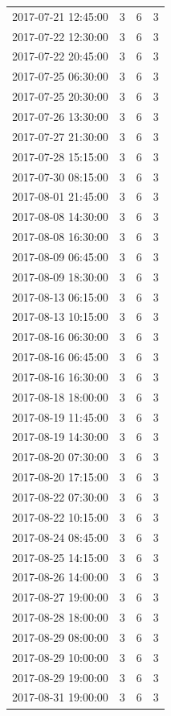 \begin{tabular}{lrrr}
2017-07-21 12:45:00 & 3 & 6 & 3 \\
2017-07-22 12:30:00 & 3 & 6 & 3 \\
2017-07-22 20:45:00 & 3 & 6 & 3 \\
2017-07-25 06:30:00 & 3 & 6 & 3 \\
2017-07-25 20:30:00 & 3 & 6 & 3 \\
2017-07-26 13:30:00 & 3 & 6 & 3 \\
2017-07-27 21:30:00 & 3 & 6 & 3 \\
2017-07-28 15:15:00 & 3 & 6 & 3 \\
2017-07-30 08:15:00 & 3 & 6 & 3 \\
2017-08-01 21:45:00 & 3 & 6 & 3 \\
2017-08-08 14:30:00 & 3 & 6 & 3 \\
2017-08-08 16:30:00 & 3 & 6 & 3 \\
2017-08-09 06:45:00 & 3 & 6 & 3 \\
2017-08-09 18:30:00 & 3 & 6 & 3 \\
2017-08-13 06:15:00 & 3 & 6 & 3 \\
2017-08-13 10:15:00 & 3 & 6 & 3 \\
2017-08-16 06:30:00 & 3 & 6 & 3 \\
2017-08-16 06:45:00 & 3 & 6 & 3 \\
2017-08-16 16:30:00 & 3 & 6 & 3 \\
2017-08-18 18:00:00 & 3 & 6 & 3 \\
2017-08-19 11:45:00 & 3 & 6 & 3 \\
2017-08-19 14:30:00 & 3 & 6 & 3 \\
2017-08-20 07:30:00 & 3 & 6 & 3 \\
2017-08-20 17:15:00 & 3 & 6 & 3 \\
2017-08-22 07:30:00 & 3 & 6 & 3 \\
2017-08-22 10:15:00 & 3 & 6 & 3 \\
2017-08-24 08:45:00 & 3 & 6 & 3 \\
2017-08-25 14:15:00 & 3 & 6 & 3 \\
2017-08-26 14:00:00 & 3 & 6 & 3 \\
2017-08-27 19:00:00 & 3 & 6 & 3 \\
2017-08-28 18:00:00 & 3 & 6 & 3 \\
2017-08-29 08:00:00 & 3 & 6 & 3 \\
2017-08-29 10:00:00 & 3 & 6 & 3 \\
2017-08-29 19:00:00 & 3 & 6 & 3 \\
2017-08-31 19:00:00 & 3 & 6 & 3 \\

\end{tabular}
